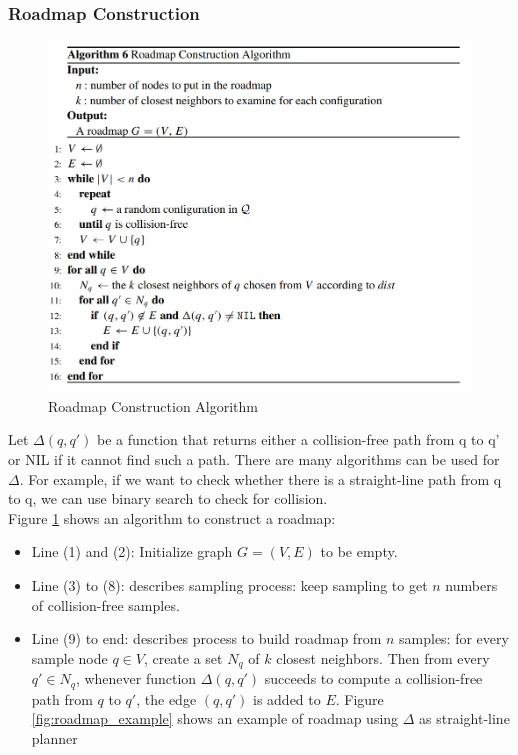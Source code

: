 \documentclass[11pt]{article}
\begin{document}
\subsubsection{Roadmap Construction}
\begin{figure}[h]
\includegraphics{PRM}
\centering
\caption{Roadmap Construction Algorithm}
\label{fig:roadmap_alg}
\end{figure}
Let $\Delta(q, q')$ be a function that returns either a collision-free path from q to q' or NIL if it cannot find such a path. There are many algorithms can be used for $\Delta$. For example, if we want to check whether there is a straight-line path from q to q, we can use binary search to check for collision.\\
Figure \ref{fig:roadmap_alg} shows an algorithm to construct a roadmap:
\begin{itemize}
\item Line (1) and (2): Initialize graph $G=(V,E)$ to be empty.
\item Line (3) to (8): describes sampling process: keep sampling to get $n$ numbers of collision-free samples.
\item Line (9) to end: describes process to build roadmap from $n$ samples: for every sample node $q\in V$, create a set $N_q$ of $k$ closest neighbors. Then from every $q' \in N_q$, whenever function $\Delta(q, q')$ succeeds to compute a collision-free path from $q$ to $q'$, the edge $(q,q')$ is added to $E$. Figure \ref{fig:roadmap_example} shows an example of roadmap using $\Delta$ as straight-line planner
\end{itemize}
\end{document}
